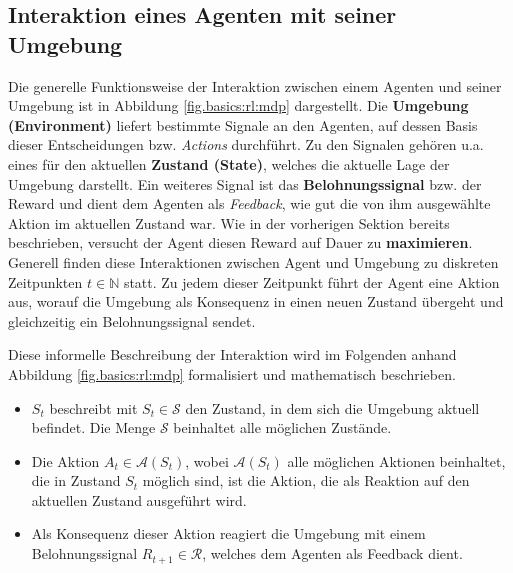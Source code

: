 	\subsection{Interaktion eines Agenten mit seiner Umgebung}
	\label{chap:basics:rl:interaction}
	
		Die generelle Funktionsweise der Interaktion zwischen einem Agenten und seiner Umgebung ist in Abbildung \ref{fig.basics:rl:mdp} dargestellt.
		Die \textbf{Umgebung (Environment)} liefert bestimmte Signale an den Agenten, auf dessen Basis dieser Entscheidungen bzw. \textit{Actions} durchführt. Zu den Signalen gehören u.a. eines für den aktuellen \textbf{Zustand (State)}, welches die aktuelle Lage der Umgebung darstellt.
		Ein weiteres Signal ist das \textbf{Belohnungssignal} bzw. der Reward und dient dem Agenten als \textit{Feedback}, wie gut die von ihm ausgewählte Aktion im aktuellen Zustand war.
		Wie in der vorherigen Sektion bereits beschrieben, versucht der Agent diesen Reward auf Dauer zu \textbf{maximieren}.
		Generell finden diese Interaktionen zwischen Agent und Umgebung zu diskreten Zeitpunkten $t \in \mathbb{N}$ statt. Zu jedem dieser Zeitpunkt führt der Agent eine Aktion aus, worauf die Umgebung als Konsequenz in einen neuen Zustand übergeht und gleichzeitig ein Belohnungssignal sendet.
		
		Diese informelle Beschreibung der Interaktion wird im Folgenden anhand Abbildung \ref{fig.basics:rl:mdp} formalisiert und mathematisch beschrieben.
		
		\begin{itemize}
			\item $S_t$ beschreibt mit $S_t \in \mathcal{S}$ den Zustand, in dem sich die Umgebung aktuell befindet. Die Menge $\mathcal{S}$ beinhaltet alle möglichen Zustände.
			\item Die Aktion $A_t \in \mathcal{A}(S_t)$, wobei $\mathcal{A}(S_t)$ alle möglichen Aktionen beinhaltet, die in Zustand $S_t$ möglich sind, ist die Aktion, die als Reaktion auf den aktuellen Zustand ausgeführt wird.
			\item Als Konsequenz dieser Aktion reagiert die Umgebung mit einem Belohnungssignal $R_{t+1} \in \mathcal{R}$, welches dem Agenten als Feedback dient.
		\end{itemize}
		

